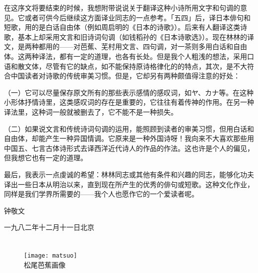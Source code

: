 {    在这序文将要结束的时候，我想附带说说关于翻译这种小诗所用文字和句调的意见。它或者可供今后继续这方面译业同志的一点参考。「五四」后，译日本俳句和短歌，用的是白话自由体（例如周启明的《日本的诗歌》）。后来有人翻译这类诗歌，基本上却采用文言和旧诗词句调（如钱稻孙的《日本诗歌选》）。现在林林的译文，是两种都用的——对芭蕉、芜村用文言、四句调，对一茶则多用白话和自由体。这两种译法，都有一定的道理，也各有长处。但是我个人粗浅的想法，采用口语和散文体，尽管有它的缺点，如不能保持原诗格律化的的特点，其次，是不大符合中国读者对诗歌的传统审美习惯。但是，它却另有两种颇值得注意的好处：

    （一）它可以尽量保存原文所有的那些表示感情的感叹词，如ヤ、カナ等。在这种小形体抒情诗里，这类感叹词的存在是重要的，它往往有着传神的作用。在另一种译法里，这种词一般就被删去了，它不能不是一种损失。

    （二）如果说文言和传统诗词句调的运用，能照顾到读者的审美习惯，但用白话和自由体，却能产生一种异国情调。它原来是一种外国诗呀！我向来不大喜欢那些用中国五、七言古体诗形式去译西洋近代诗人的作品的作法。这也许是个人的偏见，但我想它也有一定的道理。

    最后，我表示一点虔诚的希望：林林同志或其他有条件和兴趣的同志，能够化功夫译出一些日本从明治以来，直到现在所产生的优秀的俳句或短歌。这种文化作业，同样是我们学界所需要的——我个人也愿作它的一个爱读者呢。

    \hfill 钟敬文

    \hfill 一九八二年十二月十一日北京
}

\chapter[{\FM 松尾芭蕉}]{\FM {}}

\begin{center}
    \begin{figure}
        \centering
        \texttt{[image: matsuo]}\\[1em]
        \large{\FS 松尾芭蕉画像}
    \end{figure}
\end{center}

\newpage


